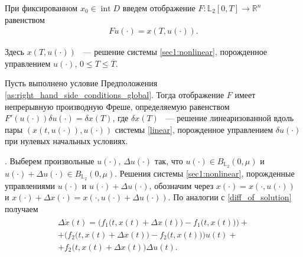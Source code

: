 \documentclass[../main.tex]{subfiles}
\begin{document}
	
	При фиксированном $x_0 \in \operatorname{int} D $ введем отображение $F: \mathbb{L}_2[0,T] \rightarrow \mathbb{R}^n $ равенством 
	\begin{gather}\label{sec1:solution_endpoint_mapping}
			Fu(\cdot) = x(T,u(\cdot)).
	\end{gather}
	
	 Здесь $ x(T,u(\cdot))$ ~--- решение системы \eqref{sec1:nonlinear}, порожденное управлением $u(\cdot)$, $0 \leqslant T \leqslant \overline{T}$. 
	
	\begin{lemma}\label{lem:FrechetDerivative}
		Пусть выполнено условие Предположения \ref{as:right_hand_side_conditions_global}.  Тогда отображение $F$ имеет непрерывную производную Фреше, определяемую равенством $ F'(u(\cdot))\delta u(\cdot) =\delta x(T)$, где $\delta x(T)$ ~--- решение линеаризованной вдоль пары $\left( x(t,u(\cdot)),u(\cdot)\right)  $ системы \eqref{linear}, порожденное управлением $\delta u(\cdot)$ при нулевых начальных условиях.
	\end{lemma}
	\doc. 
	Выберем произвольные $u(\cdot)$, $\Delta u(\cdot)$ так, что $ u(\cdot) \in B_{\mathbb{L}_2}(0,\mu)$ и $ u(\cdot) +  \Delta u(\cdot) \in B_{\mathbb{L}_2}(0,\mu)$. Решения системы \eqref{sec1:nonlinear}, порожденные управлениями  $u(\cdot)$ и $u(\cdot) + \Delta u(\cdot)$, обозначим через  $x(\cdot) = x(\cdot,u(\cdot))$ и $ x(\cdot) + \Delta x(\cdot) = x(\cdot, u(\cdot) + \Delta u(\cdot))$. По аналогии с \eqref{diff_of_solution} получаем
	\begin{gather}\label{sec1:dx}
		\begin{gathered}
			\Delta \dot{x}(t) =
			\Big( f_1\big(t, x(t)+\Delta x(t)\big) - f_1\big(t, x(t)\big) \Big)  +  \\ + 
			 \Big( f_2\big(t, x(t)+\Delta x(t)\big) - f_2\big(t,x(t)\big) \Big) u(t)  + \\ +
			 f_2\big(t, x(t)+\Delta x(t)\big)  \Delta u(t) . 
		\end{gathered}
	\end{gather}
	
\end{document}
